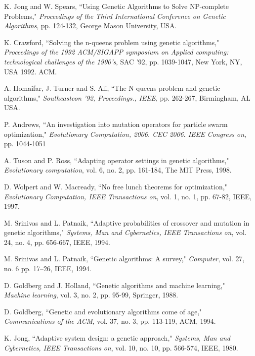 \documentclass[conference]{IEEEtran}
\begin{document}
\begin{thebibliography}{24}

 K. Jong and W. Spears, ``Using Genetic Algorithms to Solve NP-complete Problems,"
        {\it Proceedings of the Third International Conference on Genetic Algorithms}, pp. 124-132, George Mason University, USA.

 K. Crawford, ``Solving the n-queens problem using genetic algorithms,"
        {\it Proceedings of the 1992 ACM/SIGAPP symposium on Applied computing: technological challenges of the 1990's}, SAC '92, pp. 1039-1047, New York, NY, USA 1992. ACM.

 A. Homaifar, J. Turner and S. Ali, ``The N-queens problem and genetic algorithms," 
        {\it Southeastcon '92, Proceedings., IEEE}, pp. 262-267, Birmingham, AL USA.

 P. Andrews, ``An investigation into mutation operators for particle swarm optimization,"
        {\it Evolutionary Computation, 2006. CEC 2006. IEEE Congress on}, pp. 1044-1051

 A. Tuson and P. Ross, ``Adapting operator settings in genetic algorithms,"
        {\it Evolutionary computation}, vol. 6, no. 2, pp. 161-184, The MIT Press, 1998.

 D. Wolpert and W. Macready, ``No free lunch theorems for optimization,"
        {\it Evolutionary Computation, IEEE Transactions on}, vol. 1, no. 1, pp. 67-82, IEEE, 1997.

 M. Srinivas and L. Patnaik, ``Adaptive probabilities of crossover and mutation in genetic algorithms,"
        {\it Systems, Man and Cybernetics, IEEE Transactions on}, vol. 24, no. 4, pp. 656-667, IEEE, 1994.

 M. Srinivas and L. Patnaik, ``Genetic algorithms: A survey,"
        {\it Computer}, vol. 27, no. 6 pp. 17--26, IEEE, 1994.

 D. Goldberg and J. Holland, ``Genetic algorithms and machine learning,"
        {\it Machine learning}, vol. 3, no. 2, pp. 95-99, Springer, 1988.

 D. Goldberg, ``Genetic and evolutionary algorithms come of age,"
        {\it Communications of the ACM}, vol. 37, no. 3, pp. 113-119, ACM, 1994.

 K. Jong, ``Adaptive system design: a genetic approach,"
        {\it Systems, Man and Cybernetics, IEEE Transactions on}, vol. 10, no. 10, pp. 566-574, IEEE, 1980.


\end{thebibliography}
\end{document}
